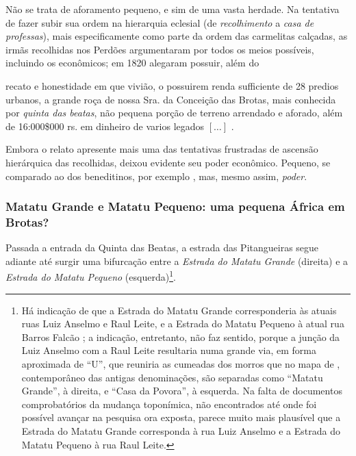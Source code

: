 Não se trata de aforamento pequeno, e sim de uma vasta herdade. Na tentativa de fazer subir sua ordem na hierarquia eclesial (de \textit{recolhimento} a \textit{casa de professas}), mais especificamente como parte da ordem das carmelitas calçadas, as irmãs recolhidas nos Perdões argumentaram por todos os meios possíveis, incluindo os econômicos; em 1820 alegaram possuir, além do 

\begin{citacao}
recato e honestidade em que vivião, o possuirem renda sufficiente de 28 predios urbanos, a grande roça de nossa Sra. da Conceição das Brotas, mais conhecida por \textit{quinta das beatas}, não pequena porção de terreno arrendado e aforado, além de 16:000\$000 rs. em dinheiro de varios legados \([\dots]\) \cite[p.~231]{accioli_memorias5_1937}.
\end{citacao}

Embora o relato apresente mais uma das tentativas frustradas de ascensão hierárquica das recolhidas, deixou evidente seu poder econômico. Pequeno, se comparado ao dos beneditinos, por exemplo \cite{bento_tombo_1945}, mas, mesmo assim, \textit{poder}. 

\subsubsection{Matatu Grande e Matatu Pequeno: uma pequena África em Brotas?}\label{subsubsec:matatu}

Passada a entrada da Quinta das Beatas, a estrada das Pitangueiras segue adiante até surgir uma bifurcação entre a \textit{Estrada do Matatu Grande} (direita) e a \textit{Estrada do Matatu Pequeno} (esquerda)\footnote{Há indicação de que a Estrada do Matatu Grande corresponderia às atuais ruas Luiz Anselmo e Raul Leite, e a Estrada do Matatu Pequeno à atual rua Barros Falcão \cite[p.~124]{valladares_beaba_2012}; a indicação, entretanto, não faz sentido, porque a junção da Luiz Anselmo com a Raul Leite resultaria numa grande via, em forma aproximada de ``U'', que reuniria as cumeadas dos morros que no mapa de , contemporâneo das antigas denominações, são separadas como ``Matatu Grande'', à direita, e ``Casa da Povora'', à esquerda. Na falta de documentos comprobatórios da mudança toponímica, não encontrados até onde foi possível avançar na pesquisa ora exposta, parece muito mais plausível que a Estrada do Matatu Grande corresponda à rua Luiz Anselmo e a Estrada do Matatu Pequeno à rua Raul Leite.}.

